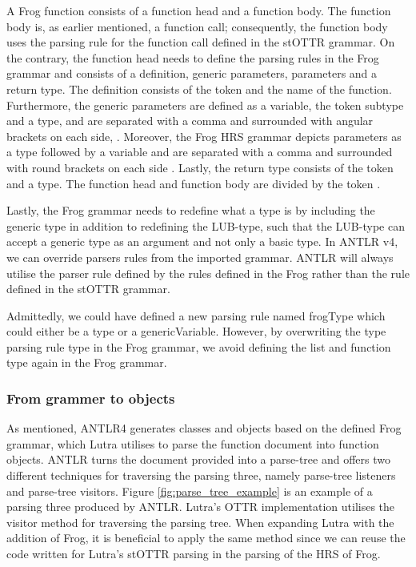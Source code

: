 \para
A Frog function consists of a function head and a function body. The function body is, as earlier mentioned, a function call; consequently, the function body uses the parsing rule for the function call defined in the stOTTR grammar. On the contrary, the function head needs to define the parsing rules in the Frog grammar and consists of a definition, generic parameters, parameters and a return type. The definition consists of the token  and the name of the function. Furthermore, the generic parameters are defined as a variable, the token subtype and a type, and are separated with a comma and surrounded with angular brackets on each side, \backgroundText{<< >>}. Moreover, the Frog HRS grammar depicts parameters as a type followed by a variable and are separated with a comma and surrounded with round brackets on each side \backgroundText{( )}. Lastly, the return type consists of the token \backgroundText{->} and a type. The function head and function body are divided by the token \backgroundText{::}.

\para


\para
Lastly, the Frog grammar needs to redefine what a type is by including the generic type in addition to redefining the LUB-type, such that the LUB-type can accept a generic type as an argument and not only a basic type. In ANTLR v4, we can override parsers rules from the imported grammar. ANTLR will always utilise the parser rule defined by the rules defined in the Frog rather than the rule defined in the stOTTR grammar.

\para


\para 
Admittedly, we could have defined a new parsing rule named frogType which could either be a type or a genericVariable. However, by overwriting the type parsing rule type in the Frog grammar, we avoid defining the list and function type again in the Frog grammar.

\subsubsection{From grammer to objects}
As mentioned, ANTLR4 generates classes and objects based on the defined Frog grammar, which Lutra utilises to parse the function document into function objects. ANTLR turns the document provided into a parse-tree and offers two different techniques for traversing the parsing three, namely parse-tree listeners and parse-tree visitors. Figure \ref{fig:parse_tree_example} is an example of a parsing three produced by ANTLR. Lutra's OTTR implementation utilises the visitor method for traversing the parsing tree. When expanding Lutra with the addition of Frog, it is beneficial to apply the same method since we can reuse the code written for Lutra's stOTTR parsing in the parsing of the HRS of Frog. 

